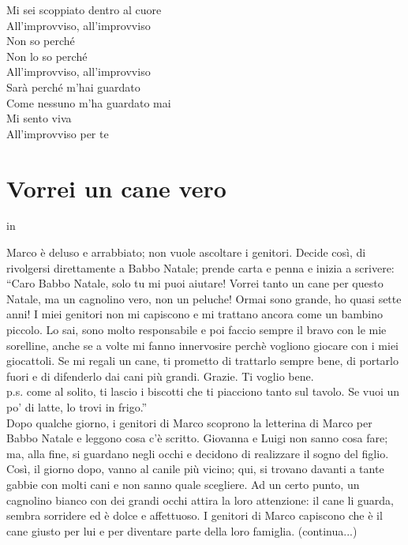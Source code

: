\documentclass[letter,11pt]{article}
\begin{document}
\begin{multicols}{2}
\noindent Mi sei scoppiato dentro al cuore \\
All'improvviso, all'improvviso \\
Non so perché \\
Non lo so perché \\
All'improvviso, all'improvviso \\

\noindent Sarà perché m'hai guardato \\
Come nessuno m'ha guardato mai \\
Mi sento viva \\
All'improvviso per te \\


\end{multicols}


\section*{Vorrei un cane vero}
 in

\noindent Marco è deluso e arrabbiato; non vuole ascoltare i genitori. Decide così, di rivolgersi direttamente a Babbo Natale; prende carta e penna e inizia a scrivere: \\

\noindent “Caro Babbo Natale, solo tu mi puoi aiutare! Vorrei tanto un cane per questo Natale, ma un cagnolino vero, non un peluche! Ormai sono grande, ho quasi sette anni! I miei genitori non mi capiscono e mi trattano ancora come un bambino piccolo. Lo sai, sono molto responsabile e poi faccio sempre il bravo con le mie sorelline, anche se a volte mi fanno innervosire perchè vogliono giocare con i miei giocattoli. Se mi regali un cane, ti prometto di trattarlo sempre bene, di portarlo fuori e di difenderlo dai cani più grandi.
Grazie. Ti voglio bene. \\

\noindent p.s. come al solito, ti lascio i biscotti che ti piacciono tanto sul tavolo. Se vuoi un po’ di latte, lo trovi in frigo.” \\

\noindent Dopo qualche giorno, i genitori di Marco scoprono la letterina di Marco per Babbo Natale e leggono cosa c’è scritto. Giovanna e Luigi non sanno cosa fare; ma, alla fine, si guardano negli occhi e decidono di realizzare il sogno del figlio. Così, il giorno dopo, vanno al canile più vicino; qui, si trovano davanti a tante gabbie con molti cani e non sanno quale scegliere. Ad un certo punto, un cagnolino bianco con dei grandi occhi attira la loro attenzione: il cane li guarda, sembra sorridere ed è dolce e affettuoso. I genitori di Marco capiscono che è il cane giusto per lui e per diventare parte della loro famiglia. (continua...)
\end{document}
